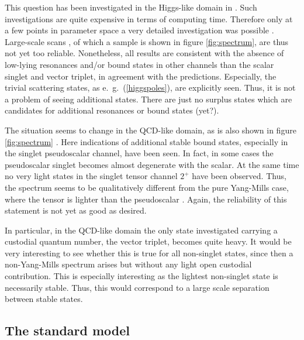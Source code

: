 \documentclass[final,12pt]{article}
\newcommand*{\pref}[1]{(\ref{#1})}
\newcommand*{\1}{1\!\!\!\bot}
\begin{document}
This question has been investigated in the Higgs-like domain in \cite{Maas:2014pba,Wurtz:2013ova}. Such investigations are quite expensive in terms of computing time. Therefore only at a few points in parameter space a very detailed investigation was possible \cite{Wurtz:2013ova}. Large-scale scans \cite{Maas:2014pba}, of which a sample is shown in figure \ref{fig:spectrum}, are thus not yet too reliable. Nonetheless, all results are consistent with the absence of low-lying resonances and/or bound states in other channels than the scalar singlet and vector triplet, in agreement with the predictions. Especially, the trivial scattering states, as e.\ g.\ \pref{higgspoles}, are explicitly seen. Thus, it is not a problem of seeing additional states. There are just no surplus states which are candidates for additional resonances or bound states (yet?).

The situation seems to change in the QCD-like domain, as is also shown in figure \ref{fig:spectrum} \cite{Maas:2014pba}. Here indications of additional stable bound states, especially in the singlet pseudoscalar channel, have been seen. In fact, in some cases the pseudoscalar singlet becomes almost degenerate with the scalar. At the same time no very light states in the singlet tensor channel $2^+$ have been observed. Thus, the spectrum seems to be qualitatively different from the pure Yang-Mills case, where the tensor is lighter than the pseudoscalar \cite{Mathieu:2008me}. Again, the reliability of this statement is not yet as good as desired.

In particular, in the QCD-like domain the only state investigated carrying a custodial quantum number, the vector triplet, becomes quite heavy. It would be very interesting to see whether this is true for all non-singlet states, since then a non-Yang-Mills spectrum arises but without any light open custodial contribution. This is especially interesting as the lightest non-singlet state is necessarily stable. Thus, this would correspond to a large scale separation between stable states.

\subsection{The standard model}\label{ss:sm}
\end{document}
